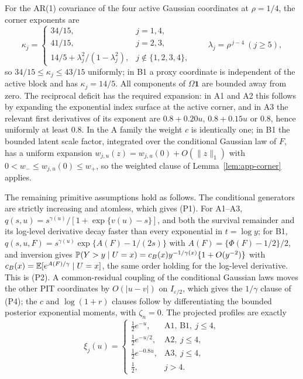 For the AR(1) covariance of the four active Gaussian coordinates at
$\rho=1/4$, the corner exponents are
\begin{equation}\label{eq:app-kappas}
 \kappa_j=
 \begin{cases}
  34/15, & j=1,4,\\
  41/15, & j=2,3,\\
  14/5+\lambda_j^2/(1-\lambda_j^2), & j\notin\{1,2,3,4\},
 \end{cases}
 \qquad \lambda_j=\rho^{\,j-4}\ (j\ge5),
\end{equation}
so $34/15\le\kappa_j\le43/15$ uniformly; in B1 a proxy coordinate is
independent of the active block and has $\kappa_j=14/5$. All components
of $\Omega\mathbf 1$ are bounded away from zero. The reciprocal deficit
has the required expansion: in A1 and A2 this follows by expanding the
exponential index surface at the active corner, and in A3 the relevant
first derivatives of its exponent are $0.8+0.20u$, $0.8+0.15u$ or $0.8$,
hence uniformly at least $0.8$. In the A family the weight $c$ is
identically one; in B1 the bounded latent scale factor, integrated over
the conditional Gaussian law of $F$, has a uniform expansion
$w_{j,u}(z)=w_{j,u}(0)+O(\|z\|_1)$ with $0<w_-\le w_{j,u}(0)\le w_+$, so
the weighted clause of Lemma~\ref{lem:app-corner} applies.

The remaining primitive assumptions hold as follows. The conditional
generators are strictly increasing and atomless, which gives (P1). For
A1--A3, $q(s,u)=s^{\gamma(u)}/[1+\exp\{v(u)-s\}]$, and both the survival
remainder and its log-level derivative decay faster than every
exponential in $t=\log y$; for B1,
$q(s,u,F)=s^{\gamma(u)}\exp\{A(F)-1/(2s)\}$ with
$A(F)=\{\Phi(F)-1/2\}/2$, and inversion gives
$\mathbb P(Y>y\mid U=x)=c_B(x)y^{-1/\gamma(x)}\{1+O(y^{-2})\}$ with
$c_B(x)=\mathbb E[e^{A(F)/\gamma}\mid U=x]$, the same order holding for the
log-level derivative. This is (P2). A common-residual coupling of the
conditional Gaussian laws moves the other PIT coordinates by
$O(|u-v|)$ on $I_{\varepsilon/2}$, which gives the $1/\gamma$ clause of
(P4); the $c$ and $\log(1+r)$ clauses follow by differentiating the
bounded posterior exponential moments, with $\zeta_n=0$. The projected
profiles are exactly
\[
 \xi_j(u)=
 \begin{cases}
  \tfrac12e^{-u}, & \text{A1, B1},\ j\le4,\\
  \tfrac12e^{-u/2}, & \text{A2},\ j\le4,\\
  \tfrac12e^{-0.8u}, & \text{A3},\ j\le4,\\
  \tfrac12, & j>4.
 \end{cases}
\]

